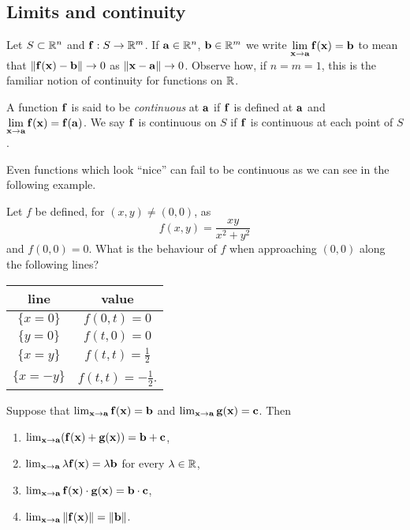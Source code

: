 \subsection*{Limits and continuity}

Let \(S\subset \bR^n\) and \(\ff : S \to \bR^m\).
If \(\aa\in \bR^n\), \(\bb\in \bR^m\) we write
    {\(  \displaystyle\lim_{\xx \to \aa}\ff(\xx) = \bb \)}
to mean that
\(\norm{\ff(\xx)-\bb} \to 0\) as \(\norm{\xx-\aa}\to 0\).
Observe how, if \(n=m=1\), this is the familiar notion of continuity for functions on \(\bR\).

\begin{definition}[continuous]
    A function \(\ff\) is said to be \emph{continuous} at \(\aa\) if \(\ff\) is defined at \(\aa\) and
    \(  \displaystyle\lim_{\xx \to \aa}\ff(\xx) = \ff(\aa)\).
    We say \(\ff\) is continuous on \(S\) if \(\ff\) is continuous at each point of \(S\).
\end{definition}

Even functions which look ``nice'' can fail to be continuous as we can see in the following example.

\begin{example*}
    Let \(f\) be defined, for \((x,y)\neq (0,0)\), as
    \[
        f(x,y) =
        \frac{x y}{x^2 + y^2}
    \]
    and \(f(0,0)=0\).
    What is the behaviour of \(f\) when approaching \((0,0)\) along the following lines?
    \begin{center}
        \begin{tabular}{ c | c } %
            line         & value                     \\
            \midrule
            \(\{x=0\}\)  & \(f(0,t) =  0\)           \\
            \(\{y=0\}\)  & \(f(t,0) = 0\)            \\
            \(\{x=y\}\)  & \(f(t,t) = \frac{1}{2}\)  \\
            \(\{x=-y\}\) & \(f(t,t) =-\frac{1}{2}\).
        \end{tabular}
    \end{center}
\end{example*}

\begin{theorem}
    Suppose that \(  \lim_{\xx \to \aa}\ff(\xx) = \bb\) and \(  \lim_{\xx \to \aa}\gg(\xx) = \cc\).
    Then
    \begin{enumerate}
        \item \(  \lim_{\xx \to \aa}(\ff(\xx)+\gg(\xx)) = \bb+\cc\), \label{it:cont-a}
        \item \(  \lim_{\xx \to \aa} \lambda \ff(\xx) = \lambda \bb\) for every \(\lambda \in \bR\), \label{it:cont-b}
        \item \(  \lim_{\xx \to \aa}\ff(\xx)\cdot \gg(\xx) = \bb\cdot \cc\), \label{it:cont-c}
        \item \(  \lim_{\xx \to \aa} \norm{\ff(\xx)} = \norm{\bb}\). \label{it:cont-d}
    \end{enumerate}
\end{theorem}

